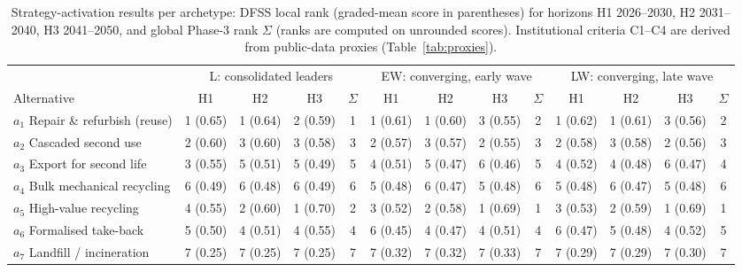 \begin{table}[pos=t]\centering\scriptsize
\caption{Strategy-activation results per archetype: DFSS local rank (graded-mean score in parentheses) for horizons H1 2026--2030, H2 2031--2040, H3 2041--2050, and global Phase-3 rank $\Sigma$ (ranks are computed on unrounded scores). Institutional criteria C1--C4 are derived from public-data proxies (Table~\ref{tab:proxies}).}
\label{tab:activation}
\begin{adjustbox}{max width=\linewidth}\begin{tabular}{@{}lcccc@{\hspace{18pt}}cccc@{\hspace{18pt}}cccc@{}}\toprule
 & \multicolumn{4}{c}{L: consolidated leaders} & \multicolumn{4}{c}{EW: converging, early wave} & \multicolumn{4}{c}{LW: converging, late wave} \\ \cmidrule(lr){2-5}\cmidrule(lr){6-9}\cmidrule(lr){10-13}
Alternative & H1 & H2 & H3 & $\Sigma$ & H1 & H2 & H3 & $\Sigma$ & H1 & H2 & H3 & $\Sigma$ \\ \midrule
$a_1$ Repair \& refurbish (reuse) & 1 (0.65) & 1 (0.64) & 2 (0.59) & 1 & 1 (0.61) & 1 (0.60) & 3 (0.55) & 2 & 1 (0.62) & 1 (0.61) & 3 (0.56) & 2 \\
$a_2$ Cascaded second use & 2 (0.60) & 3 (0.60) & 3 (0.58) & 3 & 2 (0.57) & 3 (0.57) & 2 (0.55) & 3 & 2 (0.58) & 3 (0.58) & 2 (0.56) & 3 \\
$a_3$ Export for second life & 3 (0.55) & 5 (0.51) & 5 (0.49) & 5 & 4 (0.51) & 5 (0.47) & 6 (0.46) & 5 & 4 (0.52) & 4 (0.48) & 6 (0.47) & 4 \\
$a_4$ Bulk mechanical recycling & 6 (0.49) & 6 (0.48) & 6 (0.49) & 6 & 5 (0.48) & 6 (0.47) & 5 (0.48) & 6 & 5 (0.48) & 6 (0.47) & 5 (0.48) & 6 \\
$a_5$ High-value recycling & 4 (0.55) & 2 (0.60) & 1 (0.70) & 2 & 3 (0.52) & 2 (0.58) & 1 (0.69) & 1 & 3 (0.53) & 2 (0.59) & 1 (0.69) & 1 \\
$a_6$ Formalised take-back & 5 (0.50) & 4 (0.51) & 4 (0.55) & 4 & 6 (0.45) & 4 (0.47) & 4 (0.51) & 4 & 6 (0.47) & 5 (0.48) & 4 (0.52) & 5 \\
$a_7$ Landfill / incineration & 7 (0.25) & 7 (0.25) & 7 (0.25) & 7 & 7 (0.32) & 7 (0.32) & 7 (0.33) & 7 & 7 (0.29) & 7 (0.29) & 7 (0.30) & 7 \\
\bottomrule\end{tabular}\end{adjustbox}\end{table}
